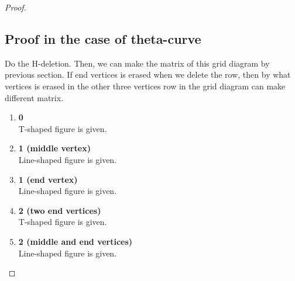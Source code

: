 \documentclass{article}
\begin{document}
\begin{proof}
\subsection{Proof in the case of theta-curve}
Do the H-deletion. Then, we can make the matrix of this grid diagram by previous section. If end vertices is erased when we delete the row, then by what vertices is erased in the other three vertices row in the grid diagram can make different matrix.
\begin{enumerate}
    \item \textbf{0}\\
    T-shaped figure is given.
    \item \textbf{1 (middle vertex)}\\
    Line-shaped figure is given.
    \item \textbf{1 (end vertex)}\\
    Line-shaped figure is given.
    \item \textbf{2 (two end vertices)}\\
    T-shaped figure is given.
    \item \textbf{2 (middle and end vertices)}\\
    Line-shaped figure is given.
\end{enumerate}


\end{proof}
\end{document}
